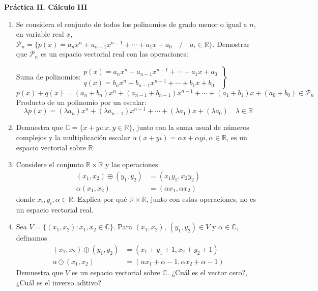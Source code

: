 \documentclass[12pt]{article}
\begin{document}
\begin{center}
    {\Large \bf Práctica II. Cálculo III}
\end{center}

\begin{enumerate}
  \item Se considera el conjunto de todos los polinomios de grado menor o igual a $n$, en variable real $x$, $\mathcal{P}_n = \{p(x)=a_nx^n+a_{n-1}x^{n-1}+\cdots+a_1x+a_0\quad /\quad a_i \in \mathbb{R} \}$. Demostrar que $\mathcal{P}_n$ es un espacio vectorial real con las operaciones:
  
  $
  \text{Suma de polinomios:}\left.\begin{array}{l}
    p(x) = a_nx^n+a_{n-1}x^{n-1}+\cdots+a_1x+a_0\\
    q(x) = b_nx^n+b_{n-1}x^{n-1}+\cdots+b_1x+b_0
  \end{array}\right\}
  $
  $$
  p(x)+q(x) = (a_n+b_n)x^n+(a_{n-1}+b_{n-1})x^{n-1}+ \cdots + (a_1+b_1)x+(a_0+b_0) \in \mathcal{P}_n
  $$
  Producto de un polinomio por un escalar:
  $$
  \lambda p(x) = (\lambda a_n)x^n + (\lambda a_{n-1})x^{n-1} + \cdots + (\lambda a_1)x + (\lambda a_0) \quad \lambda \in \mathbb{R}
  $$
  \item Demuestra que $\mathbb{C} = \{x + yi : x, y \in \mathbb{R}\}$, junto con la suma usual de números complejos y la multiplicación escalar $\alpha (x + yi) = \alpha x + \alpha yi, \alpha \in \mathbb{R}$, es un espacio vectorial sobre $\mathbb{R}$.
  \item Considere el conjunto $\mathbb{R}\times\mathbb{R}$ y las operaciones 
  \begin{align*}
    (x_1,x_2)\oplus (y_1,y_2) & = (x_1y_1,x_2y_2)\\
    \alpha (x_1,x_2) & = (\alpha x_1,\alpha x_2)    
  \end{align*}
  donde $x_i, y_i, \alpha \in \mathbb{R}$. Explica por qué $\mathbb{R} \times \mathbb{R}$, junto con estas operaciones, no es un espacio vectorial real.
  \item Sea $V = \{(x_1, x_2) : x_1, x_2 \in \mathbb{C}\}$. Para $(x_1, x_2)$, $(y_1, y_2) \in V$ y $\alpha \in \mathbb{C}$, definamos
  \begin{align*}
    (x_1, x_2) \oplus (y_1, y_2) & = (x_1 + y_1+1, x_2 + y_2+1)\\
    \alpha \odot (x_1, x_2) & = (\alpha x_1 + \alpha - 1, \alpha x_2+\alpha - 1)
  \end{align*}
  Demuestra que $V$ es un espacio vectorial sobre $\mathbb{C}$. ¿Cuál es el vector cero?, ¿Cuál es el inverso aditivo?

\end{enumerate}
\end{document}
